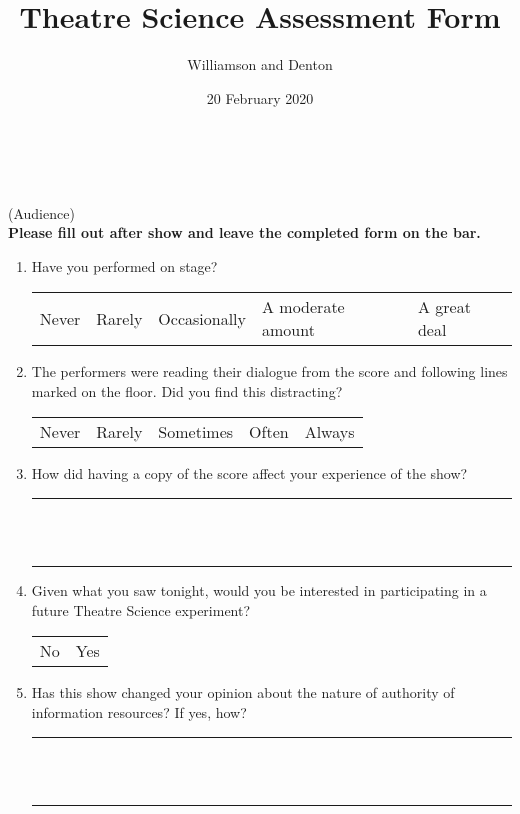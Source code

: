 \documentclass[12pt]{extarticle}
\title{Theatre Science Assessment Form}
\author{Williamson and Denton}
\date{20 February 2020}
\begin{document}
\thispagestyle{empty}

\begin{center}
  \\
  \vspace{0.3cm}
  \\
  \vspace{0.3cm}
  (Audience)\\
  \vspace{0.5cm}
  \textbf{Please fill out after show and leave the completed form on the bar.}
\end{center}

\begin{enumerate}

  \item Have you performed on stage?

  \begin{tabular}{l|l|l|l|l}
    Never & Rarely & Occasionally & A moderate amount & A great deal
  \end{tabular}

  \item The performers were reading their dialogue from the score and following lines marked on the floor.  Did you find this distracting?

  \begin{tabular}{l|l|l|l|l}
    Never &  Rarely & Sometimes & Often & Always
  \end{tabular}

  \item How did having a copy of the score affect your experience of the show?

  \vspace{0.5cm}
  \rule{6in}{1pt}\\
  \vspace{0.5cm}\\
  \rule{6in}{1pt}

  \item Given what you saw tonight, would you be interested in participating in a future Theatre Science experiment?

    \begin{tabular}{l|l}
    No & Yes
    \end{tabular}

  \item Has this show changed your opinion about the nature of authority of information resources?   If yes, how?

  \vspace{0.5cm}
  \rule{6in}{1pt}\\
  \vspace{0.5cm}\\
  \rule{6in}{1pt}


\end{enumerate}
\end{document}
